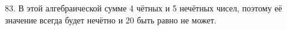 83. В этой алгебраической сумме 4 чётных и 5 нечётных чисел, поэтому её значение всегда будет нечётно и 20 быть равно не может.\\
